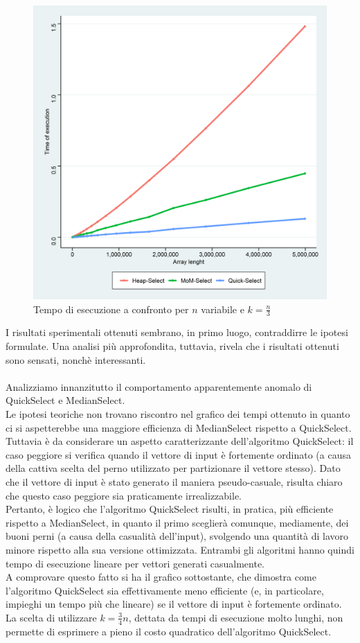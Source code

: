 \documentclass{article}
\begin{document}
	\begin{figure}[h!]
		\centering
  		\includegraphics[width=0.9	\columnwidth]{images/All_Basic_Times.png}
  		\caption{Tempo di esecuzione a confronto per $n$ variabile e $k=\frac{n}{3}$}
  		\label{fig:graph1}
	\end{figure}	
	
	I risultati sperimentali ottenuti sembrano, in primo luogo, contraddirre le ipotesi formulate. Una analisi più approfondita, tuttavia, rivela che i risultati ottenuti sono sensati, nonchè interessanti. 
	\\\\
	Analizziamo innanzitutto il comportamento apparentemente anomalo di QuickSelect e MedianSelect.
	\\
	Le ipotesi teoriche non trovano riscontro nel grafico dei tempi ottenuto in quanto ci si aspetterebbe una maggiore efficienza di MedianSelect rispetto a QuickSelect. Tuttavia è da considerare un aspetto caratterizzante dell'algoritmo QuickSelect: il caso peggiore si verifica quando il vettore di input è fortemente ordinato (a causa della cattiva scelta del perno utilizzato per partizionare il vettore stesso). Dato che il vettore di input è stato generato il maniera pseudo-casuale, risulta chiaro che questo caso peggiore sia praticamente irrealizzabile. 
	\\
	Pertanto, è logico che l'algoritmo QuickSelect risulti, in pratica, più efficiente rispetto a MedianSelect, in quanto il primo sceglierà comunque, mediamente, dei buoni perni (a causa della casualità dell'input), svolgendo una quantità di lavoro minore rispetto alla sua versione ottimizzata. Entrambi gli algoritmi hanno quindi tempo di esecuzione lineare per vettori generati casualmente. 
	\\ 
	A comprovare questo fatto si ha il grafico sottostante, che dimostra come l'algoritmo QuickSelect sia effettivamente meno efficiente (e, in particolare, impieghi un tempo più che lineare) se il vettore di input è fortemente ordinato. La scelta di utilizzare $k=\frac{3}{4}n$, dettata da tempi di esecuzione molto lunghi, non permette di esprimere a pieno il costo quadratico dell'algoritmo QuickSelect.
	
\end{document}
